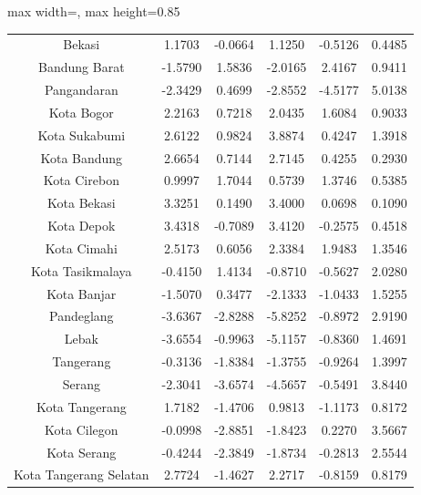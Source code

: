 \begin{table}[H]
\begin{adjustbox}{max width=\textwidth, max height=0.85\textheight}
\begin{tabular}{|c|c|c|c|c|c|}
Bekasi & 1.1703 & -0.0664 & 1.1250 & -0.5126 & 0.4485 \\
Bandung Barat & -1.5790 & 1.5836 & -2.0165 & 2.4167 & 0.9411 \\
Pangandaran & -2.3429 & 0.4699 & -2.8552 & -4.5177 & 5.0138 \\
Kota Bogor & 2.2163 & 0.7218 & 2.0435 & 1.6084 & 0.9033 \\
Kota Sukabumi & 2.6122 & 0.9824 & 3.8874 & 0.4247 & 1.3918 \\
Kota Bandung & 2.6654 & 0.7144 & 2.7145 & 0.4255 & 0.2930 \\
Kota Cirebon & 0.9997 & 1.7044 & 0.5739 & 1.3746 & 0.5385 \\
Kota Bekasi & 3.3251 & 0.1490 & 3.4000 & 0.0698 & 0.1090 \\
Kota Depok & 3.4318 & -0.7089 & 3.4120 & -0.2575 & 0.4518 \\
Kota Cimahi & 2.5173 & 0.6056 & 2.3384 & 1.9483 & 1.3546 \\
Kota Tasikmalaya & -0.4150 & 1.4134 & -0.8710 & -0.5627 & 2.0280 \\
Kota Banjar & -1.5070 & 0.3477 & -2.1333 & -1.0433 & 1.5255 \\
Pandeglang & -3.6367 & -2.8288 & -5.8252 & -0.8972 & 2.9190 \\
Lebak & -3.6554 & -0.9963 & -5.1157 & -0.8360 & 1.4691 \\
Tangerang & -0.3136 & -1.8384 & -1.3755 & -0.9264 & 1.3997 \\
Serang & -2.3041 & -3.6574 & -4.5657 & -0.5491 & 3.8440 \\
Kota Tangerang & 1.7182 & -1.4706 & 0.9813 & -1.1173 & 0.8172 \\
Kota Cilegon & -0.0998 & -2.8851 & -1.8423 & 0.2270 & 3.5667 \\
Kota Serang & -0.4244 & -2.3849 & -1.8734 & -0.2813 & 2.5544 \\
Kota Tangerang Selatan & 2.7724 & -1.4627 & 2.2717 & -0.8159 & 0.8179 \\
\hline
\end{tabular}
\end{adjustbox}
\end{table}
